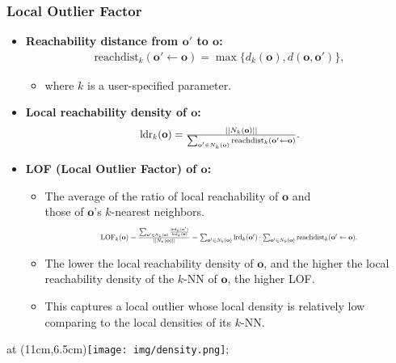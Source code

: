 \begin{frame}
	\frametitle{Local Outlier Factor}
	\begin{itemize}
		\item \textbf{\color{airforceblue}Reachability distance from $\mathbf{o'}$ to $\mathbf{o}$:}
		      \begin{align*}
			      \text{reachdist}_k(\mathbf{o'} \leftarrow \mathbf{o}) = \max \{d_k(\mathbf{o}), d(\mathbf{o},\mathbf{o'})\},
		      \end{align*}
		      \begin{itemize}
			      \item where $k$ is a user-specified parameter.
		      \end{itemize}
		\item \textbf{Local reachability density of $\mathbf{o}$:}
		      \begin{align*}
			      \resizebox{5cm}{!}{%
				      $\text{ldr}_k(\mathbf{o}) = \frac{||N_k(\mathbf{o})||}{\sum_{\mathbf{o'} \in N_k(\mathbf{o})} \text{reachdist}_k(\mathbf{o'} \leftarrow \mathbf{o})}.$}
		      \end{align*}
		\item \textbf{LOF (Local Outlier Factor) of $\mathbf{o}$:}
		      \begin{itemize}
			      \item The average of the ratio of local reachability of $\mathbf{o}$ and \\
			            those of $\mathbf{o}$'s $k$-nearest neighbors.
			            \begin{align*}
				            \resizebox{8cm}{!}{%
					            $\text{LOF}_k(\mathbf{o}) = \frac{\sum_{\mathbf{o'} \in N_k(\mathbf{o})} \frac{\text{lrd}_k(\mathbf{o'})}{\text{lrd}_k(\mathbf{o})}}{||N_k(\mathbf{o})||} =
						            \sum_{\mathbf{o'} \in N_k(\mathbf{o})} \text{lrd}_k(\mathbf{o'}) \cdot \sum_{\mathbf{o'} \in N_k(\mathbf{o})} \text{reachdist}_k(\mathbf{o'} \leftarrow \mathbf{o}).$}
			            \end{align*}
			      \item The lower the local reachability density of $\mathbf{o}$, and the higher the local reachability density of the $k$-NN of $\mathbf{o}$, the higher LOF.
			      \item This captures a local outlier whose local density is relatively low comparing to the local densities of its $k$-NN.
		      \end{itemize}
	\end{itemize}
	\tikzoverlay at (11cm,6.5cm){\texttt{[image: img/density.png]}};
\end{frame}
